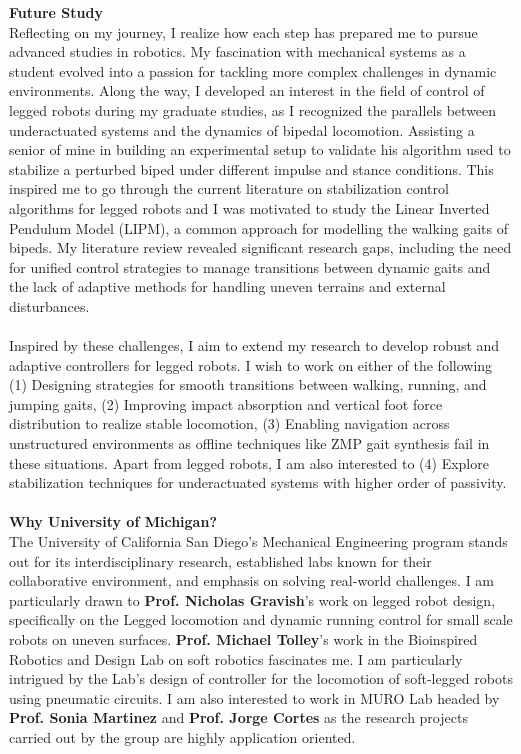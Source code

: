 \documentclass[10pt]{article}
\begin{document}
\textbf{Future Study }\\
Reflecting on my journey, I realize how each step has prepared me to pursue advanced studies in robotics. My fascination with mechanical systems as a student evolved into a passion for tackling more complex challenges in dynamic environments. Along the way, I developed an interest in the field of control of legged robots during my graduate studies, as I recognized the parallels between underactuated systems and the dynamics of bipedal locomotion. Assisting a senior of mine in building an experimental setup to validate his algorithm used to stabilize a perturbed biped under different impulse and stance conditions. This inspired me to go through the current literature on stabilization control algorithms for legged robots and I was motivated to study the Linear Inverted Pendulum Model (LIPM), a common approach for modelling the walking gaits of bipeds. My literature review revealed significant research gaps, including the need for unified control strategies to manage transitions between dynamic gaits and the lack of adaptive methods for handling uneven terrains and external disturbances. \\ \\
Inspired by these challenges, I aim to extend my research to develop robust and adaptive controllers for legged robots. I wish to work on either of the following (1) Designing strategies for smooth transitions between walking, running, and jumping gaits, (2) Improving impact absorption and vertical foot force distribution to realize stable locomotion, (3) Enabling navigation across unstructured environments as offline techniques like ZMP gait synthesis fail in these situations.  
Apart from legged robots, I am also interested to (4) Explore stabilization techniques for underactuated systems with higher order of passivity. \\ \\
\textbf{Why University of Michigan?}\\
The University of California San Diego’s Mechanical Engineering program stands out for its interdisciplinary research, established labs known for their collaborative environment, and emphasis on solving real-world challenges. I am particularly drawn to \textbf{Prof. Nicholas Gravish}’s work on legged robot design, specifically on the Legged locomotion and dynamic running control for small scale robots on uneven surfaces. \textbf{Prof. Michael Tolley}’s work in the Bioinspired Robotics and Design Lab on soft robotics fascinates me. I am particularly intrigued by the Lab’s design of controller for the locomotion of soft-legged robots using pneumatic circuits. I am also interested to work in MURO Lab headed by \textbf{Prof. Sonia Martinez} and \textbf{Prof. Jorge Cortes} as the research projects carried out by the group are highly application oriented.  \\ \\
\end{document}
